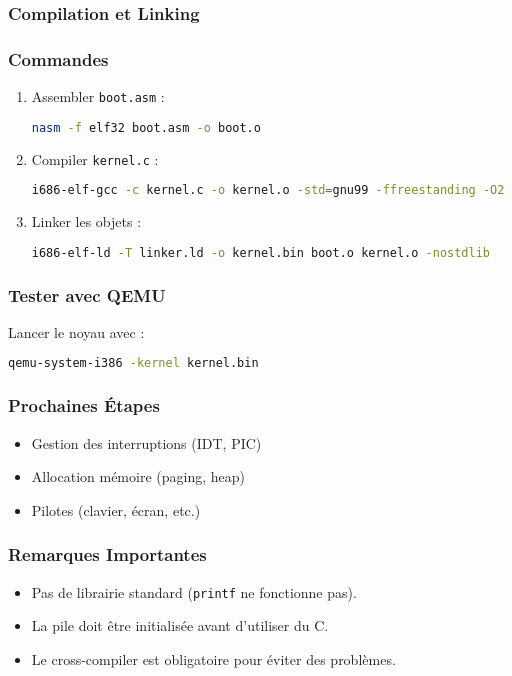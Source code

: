 \documentclass{article}
\begin{document}
\subsubsection*{Compilation et Linking}
\subsubsection*{Commandes}
\begin{enumerate}
    \item Assembler \texttt{boot.asm} :
    \begin{lstlisting}[language=bash]
    nasm -f elf32 boot.asm -o boot.o
    \end{lstlisting}
    
    \item Compiler \texttt{kernel.c} :
    \begin{lstlisting}[language=bash]
    i686-elf-gcc -c kernel.c -o kernel.o -std=gnu99 -ffreestanding -O2 -Wall -Wextra
    \end{lstlisting}
    
    \item Linker les objets :
    \begin{lstlisting}[language=bash]
    i686-elf-ld -T linker.ld -o kernel.bin boot.o kernel.o -nostdlib
    \end{lstlisting}
\end{enumerate}

\subsubsection*{Tester avec QEMU}
Lancer le noyau avec :
\begin{lstlisting}[language=bash]
qemu-system-i386 -kernel kernel.bin
\end{lstlisting}

\subsubsection*{Prochaines Étapes}
\begin{itemize}
    \item Gestion des interruptions (IDT, PIC)
    \item Allocation mémoire (paging, heap)
    \item Pilotes (clavier, écran, etc.)
\end{itemize}

\subsubsection*{Remarques Importantes}
\begin{itemize}
    \item Pas de librairie standard (\texttt{printf} ne fonctionne pas).
    \item La pile doit être initialisée avant d'utiliser du C.
    \item Le cross-compiler est obligatoire pour éviter des problèmes.
\end{itemize}
\newpage
\end{document}
